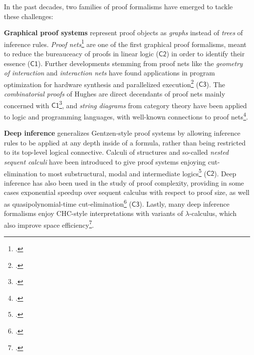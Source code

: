 \documentclass[12pt,draftproposal]{msca-pf}
\newcommand{\CH}[1]{$\mathsf{C#1}$}
\begin{document}
In the past decades, two families of proof formalisms have emerged to tackle these challenges:
\begin{description}
    \item \textbf{Graphical proof systems} represent proof objects as \emph{graphs} instead of
    \emph{trees} of inference rules.
    \emph{Proof nets}\footcite{girard-linear-1987} are one of the first graphical proof formalisms,
    meant to reduce the bureauceacy of proofs in linear logic (\CH{2}) in order to identify their
    essence (\CH{1}). Further developments stemming from proof nets like the \emph{geometry of
    interaction} and \emph{interaction nets} have found applications in program optimization for
    hardware synthesis and parallelized
    execution\footcite{ghicaGeometrySynthesisStructured2007,mackieInteractionNetImplementation2011}
    (\CH{3}). The \emph{combinatorial proofs} of Hughes are direct decendants of proof nets mainly
    concerned with \CH{1}\footcite{Hughes_2006}, and \emph{string diagrams} from category theory have
    been applied to logic and programming languages, with well-known connections to proof
    nets\footcite{piedeleuIntroductionStringDiagrams2025}.

    \item \textbf{Deep inference} generalizes Gentzen-style proof systems by allowing inference
    rules to be applied at any depth inside of a formula, rather than being restricted to its
    top-level logical connective.
    Calculi of structures and so-called \emph{nested sequent calculi} have been introduced to give
    proof systems enjoying cut-elimination to most substructural, modal and intermediate
    logics\footcite{kuznets_maehara-style_2019,postniece_proof_2010} (\CH{2}). Deep inference has
    also been used in the study of proof complexity, providing in some cases exponential speedup
    over sequent calculus with respect to proof size, as well as quasipolynomial-time
    cut-elimination\footcite{dasRelativeProofComplexity2015a,bruscoliQuasipolynomialNormalisationDeep2016a}
    (\CH{3}). Lastly, many deep inference formalisms enjoy CHC-style interpretations with variants
    of $\lambda$-calculus, which also improve space
    efficiency\footcite{guenot_nested_2013,gundersenAtomicLambdaCalculus2013}.
\end{description}
\end{document}
